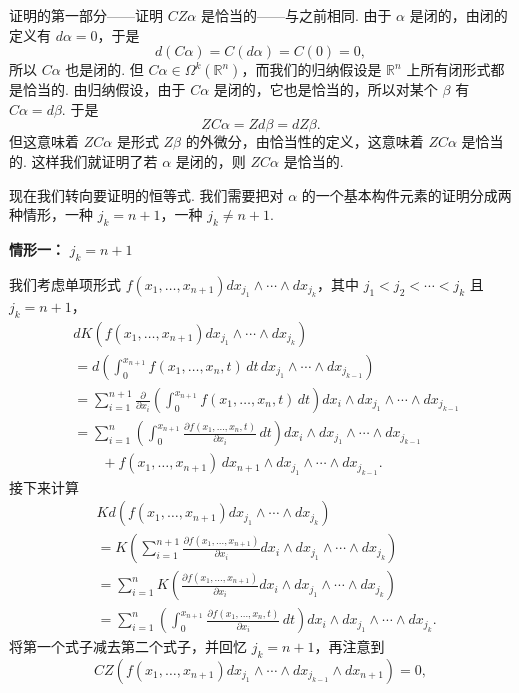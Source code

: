 证明的第一部分——证明 $CZ\alpha$ 是恰当的——与之前相同. 由于 $\alpha$ 是闭的，由闭的定义有 $d\alpha=0$，于是
\[
d(C\alpha)=C(d\alpha)=C(0)=0,
\]
所以 $C\alpha$ 也是闭的. 但 $C\alpha\in\Omega^k(\mathbb{R}^n)$，而我们的归纳假设是 $\mathbb{R}^n$ 上所有闭形式都是恰当的. 由归纳假设，由于 $C\alpha$ 是闭的，它也是恰当的，所以对某个 $\beta$ 有 $C\alpha=d\beta$. 于是
\[
ZC\alpha=Zd\beta=dZ\beta.
\]
但这意味着 $ZC\alpha$ 是形式 $Z\beta$ 的外微分，由恰当性的定义，这意味着 $ZC\alpha$ 是恰当的. 这样我们就证明了若 $\alpha$ 是闭的，则 $ZC\alpha$ 是恰当的.

现在我们转向要证明的恒等式. 我们需要把对 $\alpha$ 的一个基本构件元素的证明分成两种情形，一种 $j_k=n+1$，一种 $j_k\neq n+1$.

\textbf{情形一：} $j_k=n+1$

我们考虑单项形式 $f(x_1,\ldots,x_{n+1})dx_{j_1}\wedge\cdots\wedge dx_{j_k}$，其中 $j_1<j_2<\cdots<j_k$ 且 $j_k=n+1$，
\[
\begin{aligned}
&dK\left(f(x_1,\ldots,x_{n+1})dx_{j_1}\wedge\cdots\wedge dx_{j_k}\right)\\
&= d\left(\int_0^{x_{n+1}}f(x_1,\ldots,x_n,t)\,dt\,dx_{j_1}\wedge\cdots\wedge dx_{j_{k-1}}\right)\\
&= \sum_{i=1}^{n+1}\frac{\partial}{\partial x_i}\left(\int_0^{x_{n+1}}f(x_1,\ldots,x_n,t)\,dt\right)dx_i\wedge dx_{j_1}\wedge\cdots\wedge dx_{j_{k-1}}\\
&= \sum_{i=1}^{n}\left(\int_0^{x_{n+1}}\frac{\partial f(x_1,\ldots,x_n,t)}{\partial x_i}\,dt\right)dx_i\wedge dx_{j_1}\wedge\cdots\wedge dx_{j_{k-1}}\\
&\qquad +f(x_1,\ldots,x_{n+1})\,dx_{n+1}\wedge dx_{j_1}\wedge\cdots\wedge dx_{j_{k-1}}.
\end{aligned}
\]
接下来计算
\[
\begin{aligned}
&Kd\left(f(x_1,\ldots,x_{n+1})dx_{j_1}\wedge\cdots\wedge dx_{j_k}\right)\\
&= K\left(\sum_{i=1}^{n+1}\frac{\partial f(x_1,\ldots,x_{n+1})}{\partial x_i}dx_i\wedge dx_{j_1}\wedge\cdots\wedge dx_{j_k}\right)\\
&= \sum_{i=1}^{n}K\left(\frac{\partial f(x_1,\ldots,x_{n+1})}{\partial x_i}dx_i\wedge dx_{j_1}\wedge\cdots\wedge dx_{j_k}\right)\\
&= \sum_{i=1}^{n}\left(\int_0^{x_{n+1}}\frac{\partial f(x_1,\ldots,x_n,t)}{\partial x_i}\,dt\right)dx_i\wedge dx_{j_1}\wedge\cdots\wedge dx_{j_k}.
\end{aligned}
\]
将第一个式子减去第二个式子，并回忆 $j_k=n+1$，再注意到
\[
CZ\left(f(x_1,\ldots,x_{n+1})dx_{j_1}\wedge\cdots\wedge dx_{j_{k-1}}\wedge dx_{n+1}\right)=0,
\]
